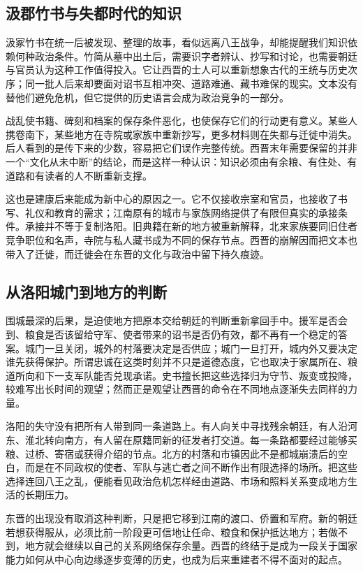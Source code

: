 \subsection{汲郡竹书与失都时代的知识}

汲冢竹书在统一后被发现、整理的故事，看似远离八王战争，却能提醒我们知识依赖何种政治条件。竹简从墓中出土后，需要识字者辨认、抄写和讨论，也需要朝廷与官员认为这种工作值得投入。它让西晋的士人可以重新想象古代的王统与历史次序；同一批人后来却要面对诏书互相冲突、道路难通、藏书难保的现实。文本没有替他们避免危机，但它提供的历史语言会成为政治竞争的一部分。

战乱使书籍、碑刻和档案的保存条件恶化，也使保存它们的行动更有意义。某些人携卷南下，某些地方在寺院或家族中重新抄写，更多材料则在失都与迁徙中消失。后人看到的是传下来的少数，容易把它们误作完整传统。西晋末年需要保留的并非一个“文化从未中断”的结论，而是这样一种认识：知识必须由有余粮、有住处、有道路和有读者的人不断重新支撑。

这也是建康后来能成为新中心的原因之一。它不仅接收宗室和官员，也接收了书写、礼仪和教育的需求；江南原有的城市与家族网络提供了有限但真实的承接条件。承接并不等于复制洛阳。旧典籍在新的地方被重新解释，北来家族要同旧住者竞争职位和名声，寺院与私人藏书成为不同的保存节点。西晋的崩解因而把文本也带入了迁徙，而迁徙会在东晋的文化与政治中留下持久痕迹。

\subsection{从洛阳城门到地方的判断}

围城最深的后果，是迫使地方把原本交给朝廷的判断重新拿回手中。援军是否会到、粮食是否该留给守军、使者带来的诏书是否仍有效，都不再有一个稳定的答案。城门一旦关闭，城外的村落要决定是否供应；城门一旦打开，城内外又要决定谁先获得保护。所谓忠诚在这类时刻并不只是道德态度，它也取决于家属所在、粮道所向和下一支军队能否兑现承诺。史书擅长把这些选择归为守节、叛变或投降，较难写出长时间的观望；然而正是观望让西晋的命令在不同地点逐渐失去同样的力量。

洛阳的失守没有把所有人带到同一条道路上。有人向关中寻找残余朝廷，有人沿河东、淮北转向南方，有人留在原籍同新的征发者打交道。每一条路都要经过能够买粮、过桥、寄宿或获得介绍的节点。北方的村落和市镇因此不是都城崩溃后的空白，而是在不同政权的使者、军队与逃亡者之间不断作出有限选择的场所。把这些选择连回八王之乱，便能看见政治危机怎样经由道路、市场和照料关系变成地方生活的长期压力。

东晋的出现没有取消这种判断，只是把它移到江南的渡口、侨置和军府。新的朝廷若想获得服从，必须比前一阶段更可信地让任命、粮食和保护抵达地方；若做不到，地方就会继续以自己的关系网络保存余量。西晋的终结于是成为一段关于国家能力如何从中心向边缘逐步变薄的历史，也成为后来重建者不得不面对的起点。

